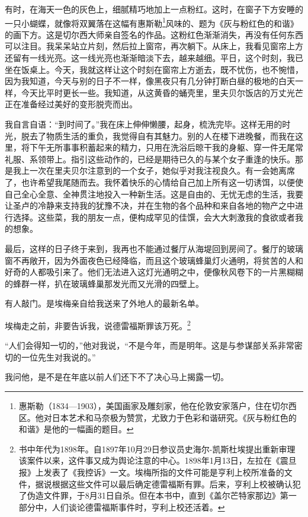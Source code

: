 \par 有时，在海天一色的灰色上，细腻精巧地加上一点粉红。这时，在窗子下方安睡的一只小蝴蝶，就像将双翼落在这幅有惠斯勒\footnote{惠斯勒（1834—1903），美国画家及雕刻家，他在伦敦安家落户，住在切尔西区。他对日本艺术和马奈极为赞赏，尤致力于色彩和谐研究。《灰与粉红色的和谐》是他的一幅画的题目。}风味的、题为《灰与粉红色的和谐》的画下方。这是切尔西大师亲自签名的作品。这粉红色渐渐消失，再没有任何东西可以注目。我呆呆站立片刻，然后拉上窗帘，再次躺下。从床上，我看见窗帘上方还留有一线光亮。这一线光亮也渐渐暗淡下去，越来越细。平日，这个时刻，我已坐在饭桌上。今天，我就这样让这个时刻在窗帘上方逝去，既不忧伤，也不惋惜，因为我知道，今天与别的日子不一样，像黑夜只有几分钟打断白昼的极地的白天一样，今天比平时更长一些。我知道，从这黄昏的蛹壳里，里夫贝尔饭店的万丈光芒正在准备经过美好的变形脱壳而出。
\par 我自言自语：“到时间了。”我在床上伸伸懒腰，起身，梳洗完毕。这样无用的时光，脱去了物质生活的重负，我觉得自有其魅力。别的人在楼下进晚餐，而我在这里，将下午无所事事积蓄起来的精力，只用在洗浴后晾干我的身躯、穿一件无尾常礼服、系领带上。指引这些动作的，已经是期待已久的与某个女子重逢的快乐。那是我上一次在里夫贝尔注意到的一个女子，她似乎对我注视良久。有一会她离席了，也许希望我尾随而去。我怀着快乐的心情给自己加上所有这一切诱饵，以便使自己全心全意、全神贯注地投入一种新生活。这是自由的、无忧无虑的生活，我要让圣卢的冷静来支持我的犹豫不决，并在生物的各个品种和来自各地的物产之中进行选择。这些菜，我的朋友一点，便构成罕见的佳馔，会大大刺激我的食欲或者我的想象。
\par 最后，这样的日子终于来到，我再也不能通过餐厅从海堤回到房间了。餐厅的玻璃窗不再敞开，因为外面夜色已经降临，而且这个玻璃蜂巢灯火通明，将贫苦的人和好奇的人都吸引来了。他们无法进入这灯光通明之中，便像秋风卷下的一片黑糊糊的蜂群一样，扒在玻璃蜂巢那发光而又光滑的四壁上。
\par 有人敲门。是埃梅亲自给我送来了外地人的最新名单。
\par 埃梅走之前，非要告诉我，说德雷福斯罪该万死。\footnote{书中年代为1898年。自1897年10月29日参议员史海尔-凯斯杜埃提出重新审理该案件以来，这件事又成为舆论注意的中心。1898年1月13日，左拉在《震旦报》上发表了《我控诉》一文。埃梅所指的文件可能是亨利上校所准备的文件，据说根据这些文件可以最后确定德雷福斯有罪。后来，亨利上校被确认犯了伪造文件罪，于8月31日自杀。但在本书中，直到《盖尔芒特家那边》第一部分中，人们谈论德雷福斯事件时，亨利上校还活着。}
\par “人们会得知一切的，”他对我说，“不是今年，而是明年。这是与参谋部关系非常密切的一位先生对我说的。”
\par 我问他，是不是在年底以前人们还下不了决心马上揭露一切。
